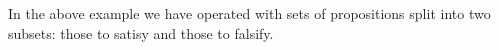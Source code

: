 

\setcounter{section}{2}
\setcounter{subsection}{4}
\setcounter{dfn}{5}

In the above example we have operated with sets of propositions split into two subsets: those to satisy and those to falsify.


